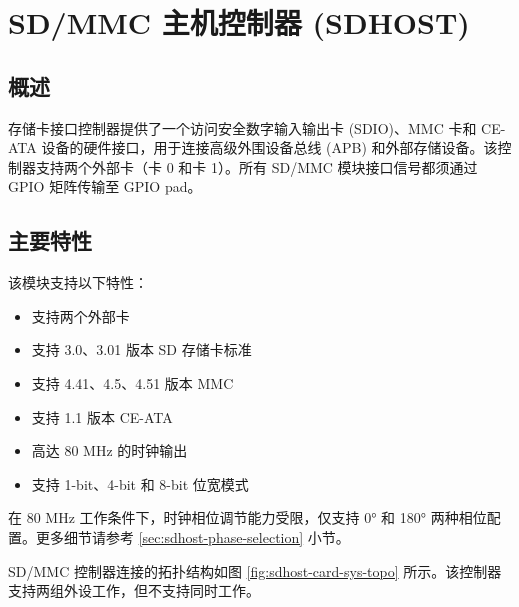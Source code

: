 \documentclass[main\_\_CN.tex]{subfiles}
\begin{document}

\ifglobal
\else
    {\let\clearpage\relax \listoftodos}
    \tableofcontents
\fi


\hypertarget{sdhost}{}
\chapter{SD/MMC 主机控制器 (SDHOST)}
\label{mod:sdhost}

\section{概述}

\chipname{} 存储卡接口控制器提供了一个访问安全数字输入输出卡 (SDIO)、MMC 卡和 CE-ATA 设备的硬件接口，用于连接高级外围设备总线 (APB) 和外部存储设备。该控制器支持两个外部卡（卡 0 和卡 1）。所有 SD/MMC 模块接口信号都须通过 GPIO 矩阵传输至 GPIO pad。

\section{主要特性}
该模块支持以下特性：

\begin{itemize}
\item 支持两个外部卡
\item 支持 3.0、3.01 版本 SD 存储卡标准
\item 支持 4.41、4.5、4.51 版本 MMC
\item 支持 1.1 版本 CE-ATA
\item 高达 80 MHz 的时钟输出
\item 支持 1-bit、4-bit 和 8-bit 位宽模式
\end{itemize}

\begin{tiplisting}
在 80 MHz 工作条件下，时钟相位调节能力受限，仅支持 0° 和 180° 两种相位配置。更多细节请参考 \ref{sec:sdhost-phase-selection} \textit{} 小节。
\end{tiplisting}

SD/MMC 控制器连接的拓扑结构如图 \ref{fig:sdhost-card-sys-topo} 所示。该控制器支持两组外设工作，但不支持同时工作。
\end{document}
